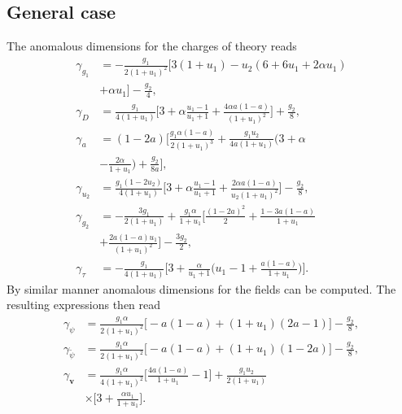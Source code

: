 \documentclass[aps,pre,url,twocolumn,superscriptaddress]{revtex4-1}
\def\mv{{\bm v}}
\begin{document}
\subsection{General case \label{app:general}}	
The anomalous dimensions for the charges of theory reads
\begin{align}
 \gamma_{g_1} & = -\frac{g_1}{2(1+u_1)^2}\biggl[
 3(1+u_1) - u_2(6+6u_1+2\alpha u_1) \nonumber\\
 &+\alpha u_1
 \biggl] - \frac{g_2}{4},\nonumber \\
 \gamma_D & =  \frac{g_1}{4(1+u_1)}\biggl[
      3+\alpha\frac{u_1-1}{u_1+1}+\frac{4\alpha a(1-a)}{(1+u_1)^2}
      \biggl] + \frac{g_2}{8} , \nonumber\\
  \gamma_a & = (1-2a)\biggl[
      \frac{g_1\alpha(1-a)}{2(1+u_1)^3} + \frac{g_1 u_2}{4a(1+u_1)} 
      \biggl( 3+\alpha \nonumber\\
      & -  \frac{2\alpha}{1+u_1} \biggl) + \frac{g_2}{8a}
  \biggl] , \nonumber\\
  \gamma_{u_2} & = 
    \frac{g_1(1-2u_2)}{4(1+u_1)}\biggl[
    3+\alpha\frac{u_1-1}{u_1+1} + \frac{2\alpha a(1-a)}{u_2(1+u_1)^2}
    \biggl]
  -\frac{g_2}{8}, \nonumber\\
  \gamma_{g_2} & = 
    -\frac{3g_1}{2(1+u_1)} + \frac{g_1\alpha}{1+u_1}\biggl[
   \frac{(1-2a)^2}{2} + \frac{1-3a(1-a)}{1+u_1} \nonumber\\
   & + \frac{2a(1-a)u_1}{(1+u_1)^2} 
   \biggl]
   -\frac{3g_2}{2}, \nonumber\\
   \gamma_{\tau} & = -\frac{g_1}{4(1+u_1)}\biggl[
   3+\frac{\alpha}{u_1+1} \biggl(
   u_1-1 + \frac{a(1-a)}{1+u_1}
   \biggl)
   \biggl].
    \label{eq:gen_anom_charges} 
\end{align}
By similar manner anomalous dimensions for the fields can be
computed. The resulting expressions then read
\begin{align}
  \gamma_{\psi} & = \frac{g_1 \alpha}{2(1+u_1)^2}\biggl[
  -a(1-a) + (1+u_1)(2a-1)
  \biggl] - \frac{g_2}{8}, \nonumber\\ 
  \gamma_{\tilde{\psi}} & =
  \frac{g_1 \alpha}{2(1+u_1)^2}\biggl[
  -a(1-a) + (1+u_1)(1-2a)
  \biggl] - \frac{g_2}{8}, \nonumber\\ 
  \gamma_{\mv} & =  \frac{g_1\alpha}{4(1+u_1)^2}\biggl[
     \frac{4a(1-a)}{1+u_1}-1 \biggl] + \frac{g_1 u_2}{2(1+u_1)} \nonumber\\
     & \times 
     \biggl[ 3+ \frac{\alpha u_1}{1+u_1} \biggl]. %
 \label{eq:gen_anom_fields}
\end{align}
\end{document}
